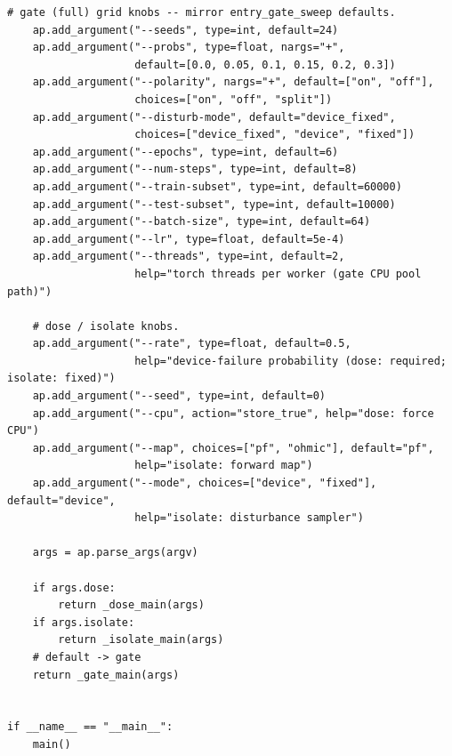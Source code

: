 \begin{lstlisting}[caption={mnn\_torch/training.py},label={lst:mnn-src-training}]
    # gate (full) grid knobs -- mirror entry_gate_sweep defaults.
    ap.add_argument("--seeds", type=int, default=24)
    ap.add_argument("--probs", type=float, nargs="+",
                    default=[0.0, 0.05, 0.1, 0.15, 0.2, 0.3])
    ap.add_argument("--polarity", nargs="+", default=["on", "off"],
                    choices=["on", "off", "split"])
    ap.add_argument("--disturb-mode", default="device_fixed",
                    choices=["device_fixed", "device", "fixed"])
    ap.add_argument("--epochs", type=int, default=6)
    ap.add_argument("--num-steps", type=int, default=8)
    ap.add_argument("--train-subset", type=int, default=60000)
    ap.add_argument("--test-subset", type=int, default=10000)
    ap.add_argument("--batch-size", type=int, default=64)
    ap.add_argument("--lr", type=float, default=5e-4)
    ap.add_argument("--threads", type=int, default=2,
                    help="torch threads per worker (gate CPU pool path)")

    # dose / isolate knobs.
    ap.add_argument("--rate", type=float, default=0.5,
                    help="device-failure probability (dose: required; isolate: fixed)")
    ap.add_argument("--seed", type=int, default=0)
    ap.add_argument("--cpu", action="store_true", help="dose: force CPU")
    ap.add_argument("--map", choices=["pf", "ohmic"], default="pf",
                    help="isolate: forward map")
    ap.add_argument("--mode", choices=["device", "fixed"], default="device",
                    help="isolate: disturbance sampler")

    args = ap.parse_args(argv)

    if args.dose:
        return _dose_main(args)
    if args.isolate:
        return _isolate_main(args)
    # default -> gate
    return _gate_main(args)


if __name__ == "__main__":
    main()
\end{lstlisting}

